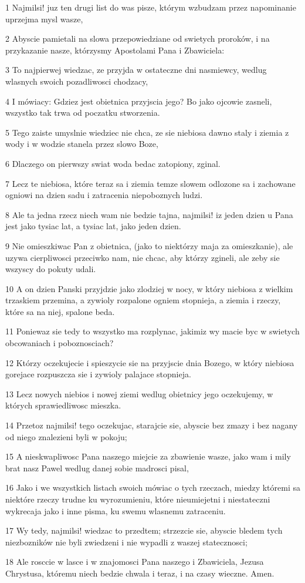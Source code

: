 \par 1 Najmilsi! juz ten drugi list do was pisze, którym wzbudzam przez napominanie uprzejma mysl wasze,
\par 2 Abyscie pamietali na slowa przepowiedziane od swietych proroków, i na przykazanie nasze, którzysmy Apostolami Pana i Zbawiciela:
\par 3 To najpierwej wiedzac, ze przyjda w ostateczne dni nasmiewcy, wedlug wlasnych swoich pozadliwosci chodzacy,
\par 4 I mówiacy: Gdziez jest obietnica przyjscia jego? Bo jako ojcowie zasneli, wszystko tak trwa od poczatku stworzenia.
\par 5 Tego zaiste umyslnie wiedziec nie chca, ze sie niebiosa dawno staly i ziemia z wody i w wodzie stanela przez slowo Boze,
\par 6 Dlaczego on pierwszy swiat woda bedac zatopiony, zginal.
\par 7 Lecz te niebiosa, które teraz sa i ziemia temze slowem odlozone sa i zachowane ogniowi na dzien sadu i zatracenia niepoboznych ludzi.
\par 8 Ale ta jedna rzecz niech wam nie bedzie tajna, najmilsi! iz jeden dzien u Pana jest jako tysiac lat, a tysiac lat, jako jeden dzien.
\par 9 Nie omieszkiwac Pan z obietnica, (jako to niektórzy maja za omieszkanie), ale uzywa cierpliwosci przeciwko nam, nie chcac, aby którzy zgineli, ale zeby sie wszyscy do pokuty udali.
\par 10 A on dzien Panski przyjdzie jako zlodziej w nocy, w który niebiosa z wielkim trzaskiem przemina, a zywioly rozpalone ogniem stopnieja, a ziemia i rzeczy, które sa na niej, spalone beda.
\par 11 Poniewaz sie tedy to wszystko ma rozplynac, jakimiz wy macie byc w swietych obcowaniach i poboznosciach?
\par 12 Którzy oczekujecie i spieszycie sie na przyjscie dnia Bozego, w który niebiosa gorejace rozpuszcza sie i zywioly palajace stopnieja.
\par 13 Lecz nowych niebios i nowej ziemi wedlug obietnicy jego oczekujemy, w których sprawiedliwosc mieszka.
\par 14 Przetoz najmilsi! tego oczekujac, starajcie sie, abyscie bez zmazy i bez nagany od niego znalezieni byli w pokoju;
\par 15 A nieskwapliwosc Pana naszego miejcie za zbawienie wasze, jako wam i mily brat nasz Pawel wedlug danej sobie madrosci pisal,
\par 16 Jako i we wszystkich listach swoich mówiac o tych rzeczach, miedzy któremi sa niektóre rzeczy trudne ku wyrozumieniu, które nieumiejetni i niestateczni wykrecaja jako i inne pisma, ku swemu wlasnemu zatraceniu.
\par 17 Wy tedy, najmilsi! wiedzac to przedtem; strzezcie sie, abyscie bledem tych niezbozników nie byli zwiedzeni i nie wypadli z waszej statecznosci;
\par 18 Ale rosccie w lasce i w znajomosci Pana naszego i Zbawiciela, Jezusa Chrystusa, któremu niech bedzie chwala i teraz, i na czasy wieczne. Amen.


